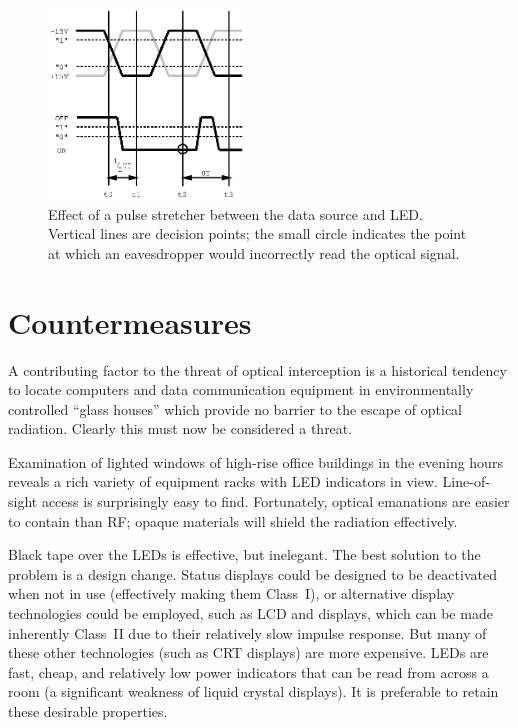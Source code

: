\documentclass{acmtrans2e}
\begin{document}
\begin{figure}
\centering
\includegraphics[height=2in]{Figure_8.eps}
\caption{Effect of a pulse stretcher between the data source and LED.  
Vertical lines are decision points; the small circle indicates the point
at which an eavesdropper would incorrectly read the optical signal.}
\label{pulse_stretcher_figure}
\end{figure}

\section{Countermeasures}\label{section:countermeasures}

A contributing factor to the threat of optical interception is a
historical tendency to locate computers and data communication equipment 
in environmentally controlled ``glass houses'' which provide no barrier 
to the escape of optical radiation.  Clearly this must now be considered 
a threat.

Examination of lighted windows of high-rise office buildings in the 
evening hours reveals a rich variety of equipment racks with LED 
indicators in view.  Line-of-sight access is surprisingly easy to find.  
Fortunately, optical emanations are easier to contain than RF; opaque 
materials will shield the radiation effectively.
 
Black tape over the LEDs is effective, but inelegant.
The best solution to the problem is a design change.
Status displays could be designed 
to be deactivated when not in use (effectively making them Class~I),
or alternative display technologies could be employed, such as LCD
and displays, which can be made inherently Class~II due to their
relatively slow impulse response.  But many of these other technologies
(such as CRT displays) are more expensive.  LEDs are fast, cheap,
and relatively 
low power indicators that can be read from across a room (a significant 
weakness of liquid crystal displays).  It is preferable to retain these
desirable properties.
\end{document}
